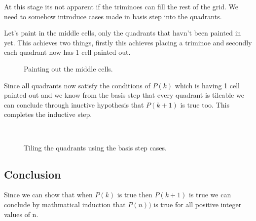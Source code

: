 \noindent
 At this stage its not apparent if the triminoes can fill the rest of the grid. We need to somehow introduce cases made in basis step into the quadrants.

\pagebreak
\noindent
Let's paint in the middle cells, only the quadrants that havn't been painted in yet. This achieves two things, firstly this achieves placing a triminoe and secondly each quadrant now has 1 cell painted out. 


\begin{figure}[H]
	\centering
	\caption{Painting out the middle cells.}
	\label{T1-figure4}
\end{figure}

\noindent
Since all quadrants now satisfy the conditions of $P(k)$ which is having 1 cell painted out and we know from the basis step that every quadrant is tileable we can conclude through inuctive hypothesis that $P(k+1)$ is true too. This completes the inductive step.

\begin{figure}[H]
	\centering
	\vspace{-5pt}
	\\
	\caption{Tiling the quadrants using the basis step cases.}
	\label{T1-figure4}
\end{figure}

\subsection{Conclusion}
Since we can show that when $P(k)$ is true then $P(k+1)$ is true we can conclude by mathmatical induction that $P(n))$ is true for all positive integer values of n. 

















